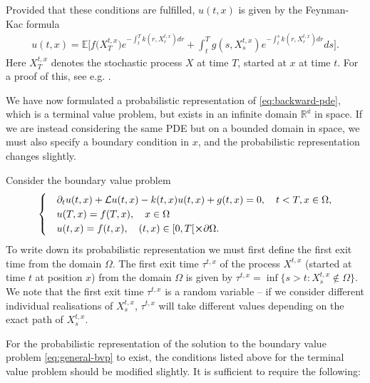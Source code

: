 Provided that these conditions are fulfilled, $u(t,x)$ is given by the Feynman-Kac formula
%
\begin{align}
    \label{eq:linear-fc} 
    u(t,x) = \mathbb{E}\bigg[ f\big( X_T^{t,x} \big) e^{-\int_t^T k(r,X_r^{t,x})dr} + \int_t^T g(s,X_s^{t,x}) e^{-\int_t^s k(r,X_r^{t,x})dr}ds\bigg].
\end{align} 
%
Here $X_T^{t,x}$ denotes the stochastic process $X$ at time $T$, started at $x$ at time $t$. For a proof of this, see e.g. \cite{gobet2016monte}.

We have now formulated a probabilistic representation of \autoref{eq:backward-pde}, which is a terminal value problem, but exists in an infinite domain $\mathbb{R^d}$ in space. If we are instead considering the same PDE but on a bounded domain in space, we must also specify a boundary condition in $x$, and the probabilistic representation changes slightly.

Consider the boundary value problem
%
\begin{align}
    \label{eq:general-bvp}
    \begin{cases}
        &\partial_t u(t,x) + \mathcal{L}u(t,x) - k(t,x)u(t,x) + g(t,x) = 0, \quad t<T,x \in \Omega, \\
        &u(T,x) = f(T,x), \quad x \in \Omega \\ 
        &u(t,x) = f(t,x), \quad (t,x) \in [0,T[\cross \partial\Omega.
    \end{cases}
\end{align}
%
To write down its probabilistic representation we must first define the first exit time from the domain $\Omega$. The first exit time $\tau^{t,x}$ of the process $X^{t,x}$ (started at time $t$ at position $x$) from the domain $\Omega$ is given by $\tau^{t,x} = \inf{\{ s > t : X^{t,x}_s \notin \Omega \}}$. We note that the first exit time $\tau^{t,x}$ is a random variable -- if we consider different individual realisations of $X_s^{t,x}$, $\tau^{t,x}$ will take different values depending on the exact path of $X_s^{t,x}$. 

For the probabilistic representation of the solution to the boundary value problem \autoref{eq:general-bvp} to exist, the conditions listed above for the terminal value problem should be modified slightly. It is sufficient to require the following:

